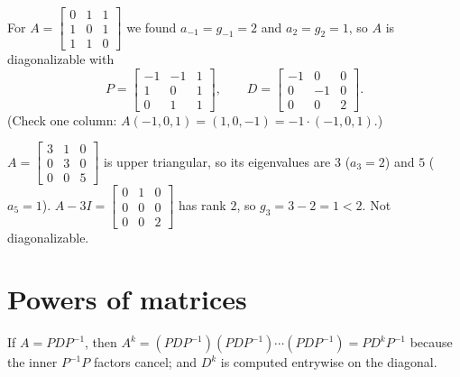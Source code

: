 \begin{example}
For $A=\begin{bmatrix}0&1&1\\1&0&1\\1&1&0\end{bmatrix}$ we found $a_{-1}=g_{-1}=2$ and $a_2=g_2=1$, so $A$ is
diagonalizable with
\[
  P=\begin{bmatrix}-1&-1&1\\1&0&1\\0&1&1\end{bmatrix},\qquad D=\begin{bmatrix}-1&0&0\\0&-1&0\\0&0&2\end{bmatrix}.
\]
(Check one column: $A(-1,0,1)=(1,0,-1)=-1\cdot(-1,0,1)$.)
\end{example}

\begin{example}
$A=\begin{bmatrix}3&1&0\\0&3&0\\0&0&5\end{bmatrix}$ is upper triangular, so its eigenvalues are $3$ ($a_3=2$) and
$5$ ($a_5=1$). $A-3I=\begin{bmatrix}0&1&0\\0&0&0\\0&0&2\end{bmatrix}$ has rank $2$, so
$g_3=3-2=1<2$. Not diagonalizable.
\end{example}

\section{Powers of matrices}

If $A=PDP^{-1}$, then $A^k=(PDP^{-1})(PDP^{-1})\cdots(PDP^{-1})=PD^kP^{-1}$ because the inner
$P^{-1}P$ factors cancel; and $D^k$ is computed entrywise on the diagonal.

